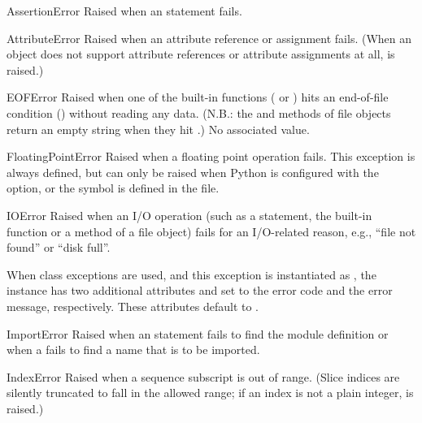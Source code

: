 \begin{excdesc}{AssertionError}
Raised when an  statement fails.
\end{excdesc}

\begin{excdesc}{AttributeError}
  Raised when an attribute reference or assignment fails.  (When an
  object does not support attribute references or attribute assignments
  at all,  is raised.)
\end{excdesc}

\begin{excdesc}{EOFError}
  Raised when one of the built-in functions ( or
  ) hits an end-of-file condition (\EOF{}) without
  reading any data.
  (N.B.: the  and  methods of file
  objects return an empty string when they hit \EOF{}.)  No associated value.
\end{excdesc}

\begin{excdesc}{FloatingPointError}
Raised when a floating point operation fails.  This exception is
always defined, but can only be raised when Python is configured with
the  option, or the 
symbol is defined in the  file.
\end{excdesc}

\begin{excdesc}{IOError}
  Raised when an I/O operation (such as a  statement, the
  built-in  function or a method of a file object) fails
  for an I/O-related reason, e.g., ``file not found'' or ``disk full''.

When class exceptions are used, and this exception is instantiated as
, the instance has two additional
attributes  and  set to the error code and
the error message, respectively.  These attributes default to
.
\end{excdesc}

\begin{excdesc}{ImportError}
  Raised when an  statement fails to find the module
  definition or when a  fails to find a
  name that is to be imported.
\end{excdesc}

\begin{excdesc}{IndexError}
  Raised when a sequence subscript is out of range.  (Slice indices are
  silently truncated to fall in the allowed range; if an index is not a
  plain integer,  is raised.)
\end{excdesc}

